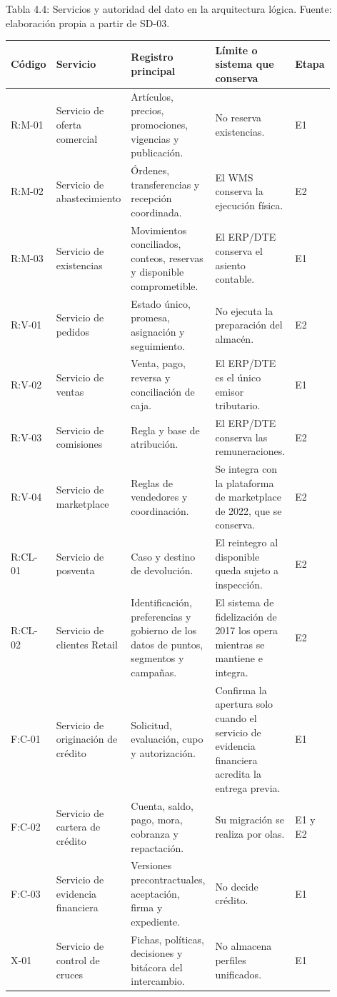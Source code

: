 \documentclass[11pt]{article}
\begin{document}
Tabla 4.4: Servicios y autoridad del dato en la arquitectura lógica. Fuente: elaboración propia a partir de SD-03.\par\nopagebreak
\begin{longtable}{@{}p{0.09\linewidth}p{0.2\linewidth}p{0.28\linewidth}p{0.25\linewidth}p{0.08\linewidth}@{}}
\toprule Código & Servicio & Registro principal & Límite o sistema que conserva & Etapa \\
\midrule\endhead\bottomrule\endlastfoot
R:M-01 & Servicio de oferta comercial & Artículos, precios, promociones, vigencias y publicación. & No reserva existencias. & E1 \\
R:M-02 & Servicio de abastecimiento & Órdenes, transferencias y recepción coordinada. & El WMS conserva la ejecución física. & E2 \\
R:M-03 & Servicio de existencias & Movimientos conciliados, conteos, reservas y disponible comprometible. & El ERP/DTE conserva el asiento contable. & E1 \\
R:V-01 & Servicio de pedidos & Estado único, promesa, asignación y seguimiento. & No ejecuta la preparación del almacén. & E2 \\
R:V-02 & Servicio de ventas & Venta, pago, reversa y conciliación de caja. & El ERP/DTE es el único emisor tributario. & E1 \\
R:V-03 & Servicio de comisiones & Regla y base de atribución. & El ERP/DTE conserva las remuneraciones. & E2 \\
R:V-04 & Servicio de marketplace & Reglas de vendedores y coordinación. & Se integra con la plataforma de marketplace de 2022, que se conserva. & E2 \\
R:CL-01 & Servicio de posventa & Caso y destino de devolución. & El reintegro al disponible queda sujeto a inspección. & E2 \\
R:CL-02 & Servicio de clientes Retail & Identificación, preferencias y gobierno de los datos de puntos, segmentos y campañas. & El sistema de fidelización de 2017 los opera mientras se mantiene e integra. & E2 \\
F:C-01 & Servicio de originación de crédito & Solicitud, evaluación, cupo y autorización. & Confirma la apertura solo cuando el servicio de evidencia financiera acredita la entrega previa. & E1 \\
F:C-02 & Servicio de cartera de crédito & Cuenta, saldo, pago, mora, cobranza y repactación. & Su migración se realiza por olas. & E1 y E2 \\
F:C-03 & Servicio de evidencia financiera & Versiones precontractuales, aceptación, firma y expediente. & No decide crédito. & E1 \\
X-01 & Servicio de control de cruces & Fichas, políticas, decisiones y bitácora del intercambio. & No almacena perfiles unificados. & E1 \\
\end{longtable}
\end{document}
